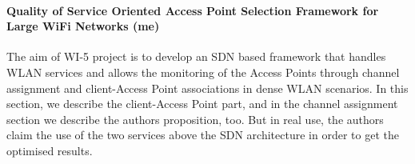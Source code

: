 \documentclass[journal,transmag]{IEEEtran}
\begin{document}
\paragraph{Quality of Service Oriented Access Point Selection Framework for Large WiFi Networks  \cite{17QOS_AP_selection,16centralised_framework_AP_selection_fittingness_factor,16SDN_based_channel_assignement} (me)} 

The aim of WI-5 project is to develop an SDN based framework that handles WLAN services and allows the monitoring of the Access Points through channel assignment and client-Access Point associations in dense WLAN scenarios. In this section, we describe the client-Access Point part, and in the channel assignment section we describe the authors proposition, too. But in real use, the authors claim the use of the two services above the SDN architecture in order to get the optimised results. \\
\end{document}
